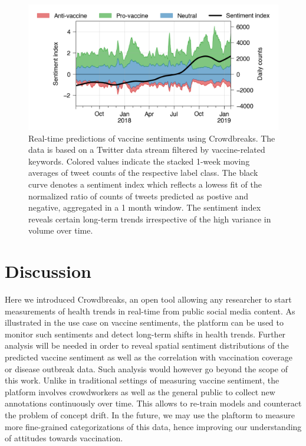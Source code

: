 \documentclass[a4paper, 11pt]{article}
\begin{document}
\begin{figure}[!ht]
\centering
\includegraphics{figures/fig4.png}
  \caption{Real-time predictions of vaccine sentiments using Crowdbreaks.
  The data is based on a Twitter data stream filtered by vaccine-related keywords. 
  Colored values indicate the stacked 1-week moving averages of tweet counts of the respective label class.
  The black curve denotes a sentiment index which reflects a lowess fit of the normalized ratio of counts of tweets predicted as postive and negative, aggregated in a 1 month window.
  The sentiment index reveals certain long-term trends irrespective of the high variance in volume over time.}
  \label{fig:fig4}
\end{figure}

\section{Discussion}
\label{sec:future_work}
Here we introduced Crowdbreaks, an open tool allowing any researcher to start measurements of health trends in real-time from public social media content. 
As illustrated in the use case on vaccine sentiments, the platform can be used to monitor such sentiments and detect long-term shifts in health trends.
Further analysis will be needed in order to reveal spatial sentiment distributions of the predicted vaccine sentiment as well as the correlation with vaccination coverage or disease outbreak data.
Such analysis would however go beyond the scope of this work.
Unlike in traditional settings of measuring vaccine sentiment, the platform involves crowdworkers as well as the general public to collect new annotations continuously over time.
This allows to re-train models and counteract the problem of concept drift.
In the future, we may use the plaftorm to measure more fine-grained categorizations of this data, hence improving our understanding of attitudes towards vaccination.\par
\end{document}
